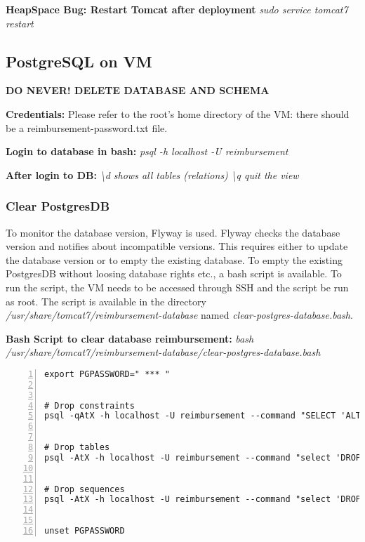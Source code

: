 \textbf{HeapSpace Bug: Restart Tomcat after deployment}\newline
\textit{sudo service tomcat7 restart}

\subsection{PostgreSQL on VM}
\label{sec:postgresOnVM}
\textbf{DO NEVER! DELETE DATABASE AND SCHEMA}

\textbf{Credentials:}\newline
Please refer to the root's home directory of the VM: there should be a reimbursement-password.txt file.


\textbf{Login to database in bash:}\newline
\textit{psql -h localhost -U reimbursement}


\textbf{After login to DB:}\newline
\textit{\textbackslash d   shows all tables (relations)}\newline
\textit{\textbackslash q   quit the view}

\subsubsection{Clear PostgresDB}
\label{sec:clear-postgresdb}
To monitor the database version, Flyway is used. Flyway checks the database version and notifies about incompatible versions. This requires either to update the database version or to empty the existing database. To empty the existing PostgresDB without loosing database rights etc., a bash script is available. To run the script, the VM needs to be accessed through SSH and the script be run as root. The script is available in the directory \textit{/usr/share/tomcat7/reimbursement-database} named \textit{clear-postgres-database.bash}.

\textbf{Bash Script to clear database reimbursement:}\newline
\textit{bash /usr/share/tomcat7/reimbursement-database/clear-postgres-database.bash}

\begin{lstlisting}[numbers=left, breaklines=true]
export PGPASSWORD=" *** "


# Drop constraints
psql -qAtX -h localhost -U reimbursement --command "SELECT 'ALTER TABLE '||table_name||' DROP CONSTRAINT '||constraint_name||';' FROM information_schema.constraint_table_usage;" | psql -h localhost -U reimbursement -qAtX


# Drop tables
psql -AtX -h localhost -U reimbursement --command "select 'DROP TABLE IF EXISTS ' || quote_ident(table_schema) || '.' || quote_ident(table_name) || ' CASCADE;' FROM information_schema.tables where table_type = 'BASE TABLE' and not table_schema ~ '^(information_schema|pg_.*)$';" | psql -h localhost -U reimbursement -AtX


# Drop sequences
psql -AtX -h localhost -U reimbursement --command "select 'DROP SEQUENCE IF EXISTS ' || quote_ident(relname) || ' CASCADE;' from pg_statio_user_sequences;" | psql -h localhost -U reimbursement -AtX


unset PGPASSWORD
\end{lstlisting}


